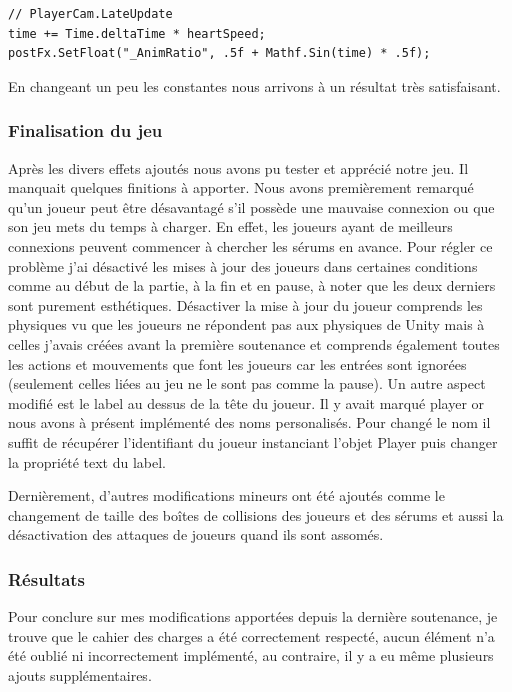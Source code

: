 \documentclass{article}
\begin{document}
\begin{lstlisting}
// PlayerCam.LateUpdate
time += Time.deltaTime * heartSpeed;
postFx.SetFloat("_AnimRatio", .5f + Mathf.Sin(time) * .5f);
\end{lstlisting}

En changeant un peu les constantes nous arrivons à un résultat très satisfaisant.

\subsubsection{Finalisation du jeu}

Après les divers effets ajoutés nous avons pu tester et apprécié notre jeu. Il manquait quelques finitions à apporter.
Nous avons premièrement remarqué qu'un joueur peut être désavantagé s'il possède une mauvaise connexion ou que son jeu mets du temps à charger. En effet, les joueurs ayant de meilleurs connexions peuvent commencer à chercher les sérums en avance. Pour régler ce problème j'ai désactivé les mises à jour des joueurs dans certaines conditions comme au début de la partie, à la fin et en pause, à noter que les deux derniers sont purement esthétiques. Désactiver la mise à jour du joueur comprends les physiques vu que les joueurs ne répondent pas aux physiques de Unity mais à celles j'avais créées avant la première soutenance et comprends également toutes les actions et mouvements que font les joueurs car les entrées sont ignorées (seulement celles liées au jeu ne le sont pas comme la pause).
Un autre aspect modifié est le label au dessus de la tête du joueur. Il y avait marqué player or nous avons à présent implémenté des noms personalisés. Pour changé le nom il suffit de récupérer l'identifiant du joueur instanciant l'objet Player puis changer la propriété text du label.

Dernièrement, d'autres modifications mineurs ont été ajoutés comme le changement de taille des boîtes de collisions des joueurs et des sérums et aussi la désactivation des attaques de joueurs quand ils sont assomés.

\subsubsection{Résultats}

Pour conclure sur mes modifications apportées depuis la dernière soutenance, je trouve que le cahier des charges a été correctement respecté, aucun élément n'a été oublié ni incorrectement implémenté, au contraire, il y a eu même plusieurs ajouts supplémentaires.
\end{document}
